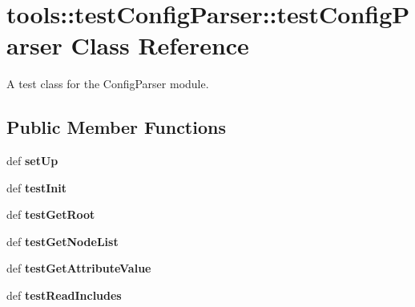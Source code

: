 \hypertarget{classtools_1_1testConfigParser_1_1testConfigParser}{
\section{tools::testConfigParser::testConfigParser Class Reference}
\label{classtools_1_1testConfigParser_1_1testConfigParser}
}
A test class for the ConfigParser module.  


\subsection*{Public Member Functions}
\begin{CompactItemize}
\item 
\hypertarget{classtools_1_1testConfigParser_1_1testConfigParser_c26e240cf3a5b3224ba506e1358c2cb9}{
def \textbf{setUp}}
\label{classtools_1_1testConfigParser_1_1testConfigParser_c26e240cf3a5b3224ba506e1358c2cb9}

\item 
\hypertarget{classtools_1_1testConfigParser_1_1testConfigParser_c9719900350ddc7bf1905387746952fa}{
def \textbf{testInit}}
\label{classtools_1_1testConfigParser_1_1testConfigParser_c9719900350ddc7bf1905387746952fa}

\item 
\hypertarget{classtools_1_1testConfigParser_1_1testConfigParser_4eaa44ca2d5be3ba1c2812bdcccb7521}{
def \textbf{testGetRoot}}
\label{classtools_1_1testConfigParser_1_1testConfigParser_4eaa44ca2d5be3ba1c2812bdcccb7521}

\item 
\hypertarget{classtools_1_1testConfigParser_1_1testConfigParser_92abba78db68f7e6f7cf994c6833dff1}{
def \textbf{testGetNodeList}}
\label{classtools_1_1testConfigParser_1_1testConfigParser_92abba78db68f7e6f7cf994c6833dff1}

\item 
\hypertarget{classtools_1_1testConfigParser_1_1testConfigParser_b49d7cff8744c74f75034419ccb212f5}{
def \textbf{testGetAttributeValue}}
\label{classtools_1_1testConfigParser_1_1testConfigParser_b49d7cff8744c74f75034419ccb212f5}

\item 
\hypertarget{classtools_1_1testConfigParser_1_1testConfigParser_d12ec88da937a6aff7329b88e4bd5c7d}{
def \textbf{testReadIncludes}}
\label{classtools_1_1testConfigParser_1_1testConfigParser_d12ec88da937a6aff7329b88e4bd5c7d}


\end{CompactItemize}
